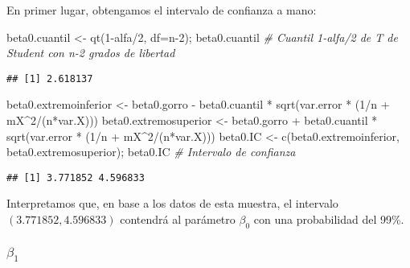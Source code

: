 \documentclass[
]{article}
\newenvironment{Shaded}{\begin{snugshade}}{\end{snugshade}}
\newcommand{\AttributeTok}[1]{\textcolor[rgb]{0.77,0.63,0.00}{#1}}
\newcommand{\CommentTok}[1]{\textcolor[rgb]{0.56,0.35,0.01}{\textit{#1}}}
\newcommand{\DecValTok}[1]{\textcolor[rgb]{0.00,0.00,0.81}{#1}}
\newcommand{\FunctionTok}[1]{\textcolor[rgb]{0.00,0.00,0.00}{#1}}
\newcommand{\NormalTok}[1]{#1}
\newcommand{\OtherTok}[1]{\textcolor[rgb]{0.56,0.35,0.01}{#1}}
\newcommand{\SpecialCharTok}[1]{\textcolor[rgb]{0.00,0.00,0.00}{#1}}
\begin{document}
En primer lugar, obtengamos el intervalo de confianza a mano:

\begin{Shaded}
\begin{Highlighting}[]
\NormalTok{beta0.cuantil }\OtherTok{\textless{}{-}} \FunctionTok{qt}\NormalTok{(}\DecValTok{1}\SpecialCharTok{{-}}\NormalTok{alfa}\SpecialCharTok{/}\DecValTok{2}\NormalTok{, }\AttributeTok{df=}\NormalTok{n}\DecValTok{{-}2}\NormalTok{); beta0.cuantil       }\CommentTok{\# Cuantil 1{-}alfa/2 de T de Student con n{-}2 grados de libertad}
\end{Highlighting}
\end{Shaded}

\begin{verbatim}
## [1] 2.618137
\end{verbatim}

\begin{Shaded}
\begin{Highlighting}[]
\NormalTok{beta0.extremoinferior }\OtherTok{\textless{}{-}}\NormalTok{ beta0.gorro }\SpecialCharTok{{-}}\NormalTok{ beta0.cuantil }\SpecialCharTok{*} \FunctionTok{sqrt}\NormalTok{(var.error }\SpecialCharTok{*}\NormalTok{ (}\DecValTok{1}\SpecialCharTok{/}\NormalTok{n }\SpecialCharTok{+}\NormalTok{ mX}\SpecialCharTok{\^{}}\DecValTok{2}\SpecialCharTok{/}\NormalTok{(n}\SpecialCharTok{*}\NormalTok{var.X)))}
\NormalTok{beta0.extremosuperior }\OtherTok{\textless{}{-}}\NormalTok{ beta0.gorro }\SpecialCharTok{+}\NormalTok{ beta0.cuantil }\SpecialCharTok{*} \FunctionTok{sqrt}\NormalTok{(var.error }\SpecialCharTok{*}\NormalTok{ (}\DecValTok{1}\SpecialCharTok{/}\NormalTok{n }\SpecialCharTok{+}\NormalTok{ mX}\SpecialCharTok{\^{}}\DecValTok{2}\SpecialCharTok{/}\NormalTok{(n}\SpecialCharTok{*}\NormalTok{var.X)))}
\NormalTok{beta0.IC }\OtherTok{\textless{}{-}} \FunctionTok{c}\NormalTok{(beta0.extremoinferior, beta0.extremosuperior); beta0.IC      }\CommentTok{\# Intervalo de confianza}
\end{Highlighting}
\end{Shaded}

\begin{verbatim}
## [1] 3.771852 4.596833
\end{verbatim}

Interpretamos que, en base a los datos de esta muestra, el intervalo
\((3.771852, 4.596833)\) contendrá al parámetro \(\beta_0\) con una
probabilidad del 99\%.

\hypertarget{beta_1}{%
\subsubsection{\texorpdfstring{\(\beta_1\)}{\textbackslash beta\_1}}\label{beta_1}}
\end{document}

